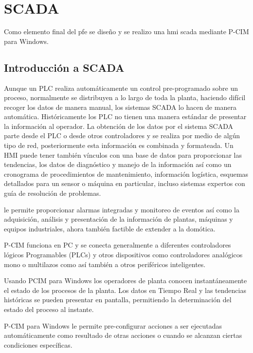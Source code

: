 \chapter{SCADA}
\label{ch:scada}

Como elemento final del \gls{pfe} se diseño y se realizo una \gls{hmi} \gls{scada}
mediante P-CIM para Windows.

\section{Introducción a SCADA}
\label{sec:IntroScada}
Aunque un PLC realiza automáticamente un control pre-programado sobre un proceso, 
normalmente se distribuyen a lo largo de toda la planta, haciendo difícil recoger 
los datos de manera manual, los sistemas SCADA lo hacen de manera automática. 
Históricamente los PLC no tienen una manera estándar de presentar la información 
al operador. La obtención de los datos por el sistema SCADA parte desde el PLC o 
desde otros controladores y se realiza por medio de algún tipo de red, 
posteriormente esta información es combinada y formateada. Un HMI puede tener 
también vínculos con una base de datos para proporcionar las tendencias, los datos 
de diagnóstico y manejo de la información así como un cronograma de procedimientos 
de mantenimiento, información logística, esquemas detallados para un sensor o 
máquina en particular, incluso sistemas expertos con guía de resolución de 
problemas.

 le permite proporcionar alarmas integradas y monitoreo de eventos así como la 
 adquisición, análisis y presentación de la información de plantas, máquinas y 
 equipos industriales, ahora también factible de extender a la domótica.

P-CIM funciona en PC y se conecta generalmente a diferentes controladores 
lógicos Programables (PLCs) y otros dispositivos como controladores analógicos 
mono o multilazos como así también a otros periféricos inteligentes. 


Usando PCIM para Windows los operadores de planta conocen instantáneamente 
el estado de los procesos de la planta. Los datos en Tiempo Real y las 
tendencias históricas se pueden presentar en pantalla, permitiendo la 
determinación del estado del proceso al instante.

P-CIM para Windows le permite pre-configurar acciones a ser ejecutadas 
automáticamente como resultado de otras acciones o cuando se alcanzan 
ciertas condiciones específicas.

